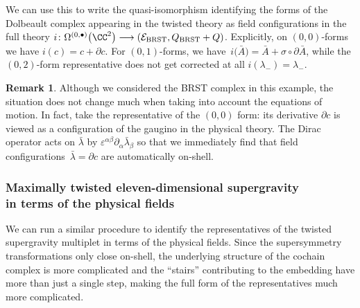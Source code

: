 \documentclass[pdftex]{sigma}
\numberwithin{equation}{section}
\theoremstyle{definition}
\newtheorem{Remark}[Theorem]{Remark}
\def\cE{\mathcal E}\def\cF{\mathcal F}\def\cG{\mathcal G}\def\cH{\mathcal H}
\begin{document}
We can use this to write the quasi-isomorphism identifying the forms of the Dolbeault complex appearing in the twisted theory as field configurations in the full theory
$
 i \colon \Omega^{(0,\bullet)}\big(\CC^2\big) \longrightarrow (\cE_{\rm BRST} , Q_{\rm BRST} + Q)$.
Explicitly, on $(0,0)$-forms we have
$ i(c) = c + \partial c$.
For $(0,1)$-forms, we have~${
 i\big(\bar{A}\big) = \bar{A} + \sigma \circ \partial \bar{A}}$,
while the $(0,2)$-form representative does not get corrected at all
$ {i(\lambda_-) = \lambda_-}$.

\begin{Remark}
 Although we considered the BRST complex in this example, the situation does not change much when taking into account the equations of motion. In fact, take the representative of the $(0,0)$ form: its derivative $\partial c$ is viewed as a configuration of the gaugino in the physical theory. The Dirac operator acts on $\bar{\lambda}$ by $\varepsilon^{\alpha \beta} \partial_\alpha \bar{\lambda}_\beta$ so that we immediately find that field configurations~${\bar{\lambda} = \partial c}$ are automatically on-shell.
\end{Remark}

\subsubsection[Maximally twisted eleven-dimensional supergravity in terms of the physical fields]{Maximally twisted eleven-dimensional supergravity\\ in terms of the physical fields}\label{p: max-stair}

We can run a similar procedure to identify the representatives of the twisted supergravity multiplet in terms of the physical fields. Since the supersymmetry transformations only close on-shell, the underlying structure of the cochain complex is more complicated and the ``stairs'' contributing to the embedding have more than just a single step, making the full form of the representatives much more complicated.
\end{document}
